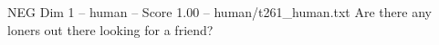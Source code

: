 \begin{textsample}{NEG Dim 1 – human – Score 1.00 – human/t261\_human.txt}  \label{ex:f1_neg_007}
Are there any loners out there looking for a friend?

\end{textsample}
